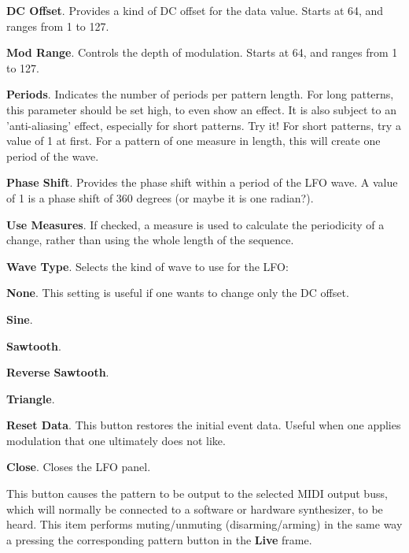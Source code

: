    \begin{enumber}
      \item \textbf{DC Offset}.
         Provides a kind of DC offset for the data value. Starts at 64, and
         ranges from 1 to 127.
      \item \textbf{Mod Range}.
         Controls the depth of modulation. Starts at 64, and ranges from 1 to
         127.
      \item \textbf{Periods}.
         Indicates the number of periods per pattern length.
         For long patterns, this parameter should be set high,
         to even show an effect.  It is also subject to an 'anti-aliasing'
         effect, especially for short patterns.
         Try it!  For short patterns, try a value of 1 at first.  For a pattern
         of one measure in length, this will create one period of the wave.
      \item \textbf{Phase Shift}.
         Provides the phase shift within a period of the LFO wave.
         A value of 1 is a phase shift of 360 degrees (or maybe it is one
         radian?).
      \item \textbf{Use Measures}.
         If checked, a measure is used to calculate the periodicity of a
         change, rather than using the whole length of the sequence.
      \item \textbf{Wave Type}.
         Selects the kind of wave to use for the LFO:
         \begin{enumber}
            \item \textbf{None}.
               This setting is useful if one wants to change only the DC
               offset.
            \item \textbf{Sine}.
            \item \textbf{Sawtooth}.
            \item \textbf{Reverse Sawtooth}.
            \item \textbf{Triangle}.
         \end{enumber}
      \item \textbf{Reset Data}.
         This button restores the initial event data.  Useful when one applies
         modulation that one ultimately does not like.
      \item \textbf{Close}.  Closes the LFO panel.
   \end{enumber}

   This button causes the pattern to be output to the
   selected MIDI output buss,
   which will normally be connected to a software or hardware
   synthesizer, to be heard.
   This item performs muting/unmuting (disarming/arming) in the same way a
   pressing the corresponding pattern button in the \textbf{Live} frame.

